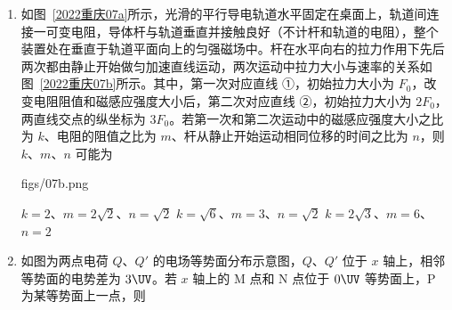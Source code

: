 \documentclass[\gkver]{gaokaozhenti}
\begin{document}
\begin{enumerate}
{故选 C。
}

\item
如图~\ref{2022重庆07a}所示，光滑的平行导电轨道水平固定在桌面上，轨道间连接一可变电阻，导体杆与轨道垂直并接触良好（不计杆和轨道的电阻），整个装置处在垂直于轨道平面向上的匀强磁场中。杆在水平向右的拉力作用下先后两次都由静止开始做匀加速直线运动，两次运动中拉力大小与速率的关系如图~\ref{2022重庆07b}所示。其中，第一次对应直线 ①，初始拉力大小为 $F_{0}$，改变电阻阻值和磁感应强度大小后，第二次对应直线 ②，初始拉力大小为 $2F_{0}$，两直线交点的纵坐标为 $3F_{0}$。若第一次和第二次运动中的磁感应强度大小之比为 $k$、电阻的阻值之比为 $m$、杆从静止开始运动相同位移的时间之比为 $n$，则 $k$、$m$、$n$ 可能为

{figs/07b.png}

{$k = 2$、$m = 2\sqrt 2$、$n = \sqrt 2$}
{$k = \sqrt 6$、$m = 3$、$n = \sqrt 2$}
{$k = 2\sqrt 3$、$m = 6$、$n = 2$}


\item
如图为两点电荷 $Q$、$Q'$ 的电场等势面分布示意图，$Q$、$Q'$ 位于 $x$ 轴上，相邻等势面的电势差为 $3\UV$。若 $x$ 轴上的 M 点和 N 点位于 $0\UV$ 等势面上，P 为某等势面上一点，则


\end{enumerate}
\end{document}
